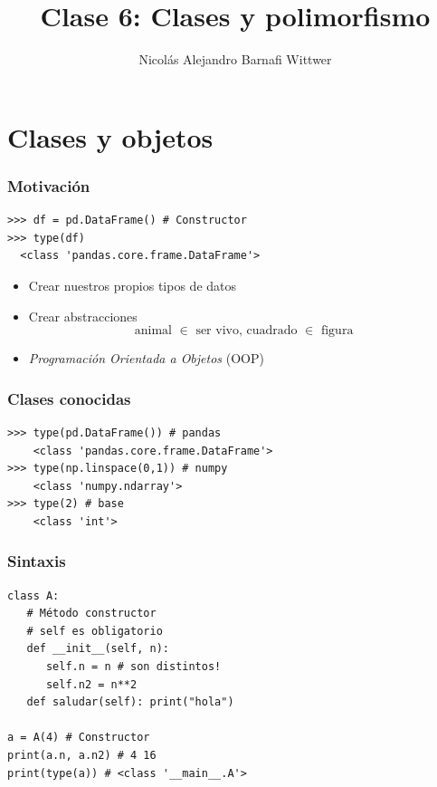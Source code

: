 \documentclass[14pt,aspectratio=169,xcolor=dvipsnames]{beamer}
\title[short title]{Clase 6: Clases y polimorfismo}
\subtitle{}
\author[NA Barnafi] {Nicolás Alejandro Barnafi Wittwer}
\institute[UC|CMM] 
{
    Pontificia Universidad Católica de Chile \\
    Centro de Modelamiento Matemático
}
\date{}
\begin{document}
\begin{frame}
    \maketitle
\end{frame}
\section{Clases y objetos}
\begin{frame}[fragile]\frametitle{Motivación}
    \begin{verbatim}
>>> df = pd.DataFrame() # Constructor
>>> type(df)
  <class 'pandas.core.frame.DataFrame'>
    \end{verbatim}
    \begin{itemize}
        \item Crear nuestros propios tipos de datos
        \item Crear abstracciones 
    \[ \text{animal $\in$ ser vivo, cuadrado $\in$ figura }\]
        \item \emph{Programación Orientada a Objetos} (OOP)
    \end{itemize}
\end{frame}
\begin{frame}[fragile]\frametitle{Clases conocidas}
    \begin{verbatim}
>>> type(pd.DataFrame()) # pandas
    <class 'pandas.core.frame.DataFrame'>
>>> type(np.linspace(0,1)) # numpy
    <class 'numpy.ndarray'>
>>> type(2) # base
    <class 'int'>
    \end{verbatim}
\end{frame}
\begin{frame}[fragile]\frametitle{Sintaxis}
    \begin{verbatim}
class A:
   # Método constructor
   # self es obligatorio
   def __init__(self, n):
      self.n = n # son distintos!
      self.n2 = n**2
   def saludar(self): print("hola")

a = A(4) # Constructor
print(a.n, a.n2) # 4 16
print(type(a)) # <class '__main__.A'>
    \end{verbatim}

\end{frame}
\end{document}
